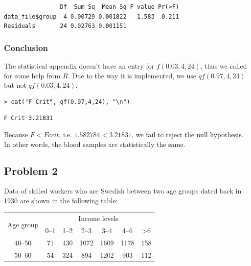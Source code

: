 \documentclass[a4paper]{article}
\numberwithin{equation}{section}
\begin{document}
\begin{mdframed}[leftline=false,rightline=false,backgroundcolor=magenta!10,nobreak=true]
  \begin{verbatim}
                Df  Sum Sq  Mean Sq F value Pr(>F)
data_file$group  4 0.00729 0.001822   1.583  0.211
Residuals       24 0.02763 0.001151
  \end{verbatim}
\end{mdframed}

\subsubsection{Conclusion}
The statistical appendix doesn't have an entry for \(f(0.03, 4, 24)\), thus we called for some help from \(R\).
Due to the way it is implemented, we use \(qf(0.97, 4, 24)\) but not \(qf(0.03, 4, 24)\).
\begin{mdframed}[leftline=false,rightline=false,backgroundcolor=magenta!10,nobreak=true]
  \begin{verbatim}
> cat("F Crit", qf(0.97,4,24), "\n")
  \end{verbatim}
  \begin{verbatim}
F Crit 3.21831
  \end{verbatim}
\end{mdframed}

Because \(F < F crit\), i.e. \(1.582784 < 3.21831\), we fail to reject the null hypothesis.
In other words, the blood samples are statistically the same.

\newpage
\subsection{Problem 2}\label{p2}
Data of skilled workers who are Swedish between two age groups dated back in 1930 are shown in the following table:

\begin{center}
  \begin{tabular}{ccccccc}
    \toprule
    \multirow{2}{*}{Age group} & \multicolumn{6}{c}{Income levels}                                   \\
    \cmidrule(lr){2-7}
                               & 0--1                              & 1--2 & 2--3 & 3--4 & 4--6 & >6  \\
    \midrule
    40--50                     & 71                                & 430  & 1072 & 1609 & 1178 & 158 \\
    50--60                     & 54                                & 324  & 894  & 1202 & 903  & 112 \\
    \bottomrule
  \end{tabular}
\end{center}
\end{document}

